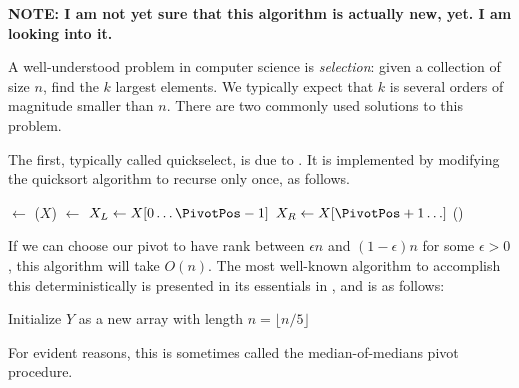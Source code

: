 \documentclass[11pt]{article}
\begin{document}
{\bf NOTE: I am not yet sure that this algorithm is actually new, yet.  I am looking into it.}

A well-understood problem in computer science is {\em selection}: given a collection of size $n$, find the $k$ largest elements.  We typically expect that $k$ is several orders of magnitude smaller than $n$.  There are two commonly used solutions to this problem.  

The first, typically called quickselect, is due to \cite{Ho61}.  It is implemented by modifying the quicksort algorithm to recurse only once, as follows.

\begin{algorithm}[H]
\Pivot$\leftarrow$ \ChoosePivot($X$)\;
\PivotPos$\leftarrow$\;
$X_L \leftarrow X[0 \ldots \PivotPos - 1]$
$X_R \leftarrow X[\PivotPos + 1 \ldots]$
\lElse(){\Return{}}
\end{algorithm}
If we can choose our pivot to have rank between $\epsilon n$ and $(1-\epsilon) n$ for some $\epsilon > 0$, this algorithm will take $O(n)$.  The most well-known algorithm to accomplish this deterministically is presented in its essentials in \cite{BFPRT73}, and is as follows:

\begin{algorithm}[H]
Initialize $Y$ as a new array with length $n = \lfloor n/5 \rfloor$\;
\;
\;
\end{algorithm}
For evident reasons, this is sometimes called the median-of-medians pivot procedure.
\end{document}
